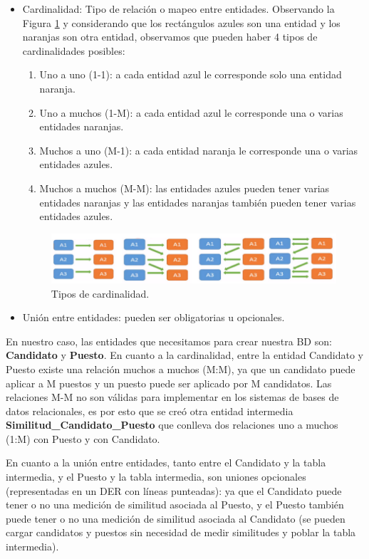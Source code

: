\documentclass[12pt,a4paper]{article}
\begin{document}
\begin{sloppypar}
\begin{itemize}
\item Cardinalidad: Tipo de relación o mapeo entre entidades. Observando la Figura \ref{fig:Cardinalidad} y considerando que los rectángulos azules son una entidad y los naranjas son otra entidad, observamos que pueden haber 4 tipos de cardinalidades posibles:

\begin{enumerate}
\item Uno a uno (1-1): a cada entidad azul le corresponde solo una entidad naranja.
\item Uno a muchos (1-M): a cada entidad azul le corresponde una o varias entidades naranjas.
\item Muchos a uno (M-1): a cada entidad naranja le corresponde una o varias entidades azules.
\item Muchos a muchos (M-M): las entidades azules pueden tener varias entidades naranjas y las entidades naranjas también pueden tener varias entidades azules.
\end{enumerate}

\begin{figure}[H]    %
 \centering
 \includegraphics[width=1\textwidth]{images/Cardinalidad.png}
 \caption{Tipos de cardinalidad.} 
 \label{fig:Cardinalidad}
\end{figure}

\item Unión entre entidades: pueden ser obligatorias u opcionales.
\end{itemize}

En nuestro caso, las entidades que necesitamos para crear nuestra BD son: \textbf{Candidato} y \textbf{Puesto}. En cuanto a la cardinalidad, entre la entidad Candidato y Puesto existe una relación muchos a muchos (M:M), ya que un candidato puede aplicar a M puestos y un puesto puede ser aplicado por M candidatos. Las relaciones M-M no son válidas para implementar en los sistemas de bases de datos relacionales\cite{mod_ent_relacion_barker}, es por esto que se creó otra entidad intermedia \textbf{Similitud\_Candidato\_Puesto} que conlleva dos relaciones uno a muchos (1:M) con Puesto y con Candidato. 

En cuanto a la unión entre entidades, tanto entre el Candidato y la tabla intermedia, y el Puesto y la tabla intermedia, son uniones opcionales (representadas en un DER con líneas punteadas): ya que el Candidato puede tener o no una medición de similitud asociada al Puesto, y el Puesto también puede tener o no una medición de similitud asociada al Candidato (se pueden cargar candidatos y puestos sin necesidad de medir similitudes y poblar la tabla intermedia).


\end{sloppypar}
\end{document}
